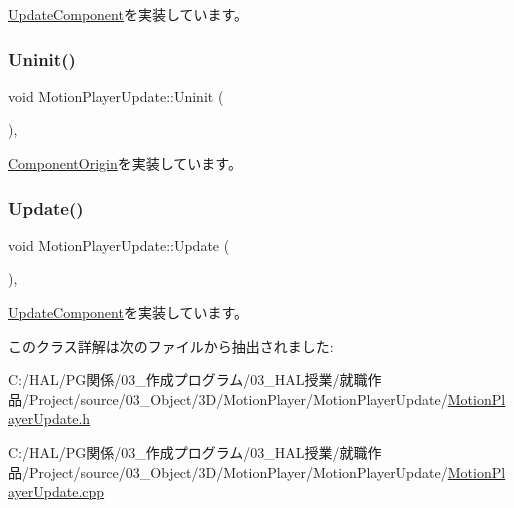 \mbox{\hyperlink{class_update_component_aecc61593be4d1feff2db4d9ff1f83f9f}{Update\+Component}}を実装しています。

\mbox{\label{class_motion_player_update_a2e896662b3f2bfbe468a6956f5d935bb}} 
\subsubsection{\texorpdfstring{Uninit()}{Uninit()}}
{\footnotesize\ttfamily void Motion\+Player\+Update\+::\+Uninit (\begin{DoxyParamCaption}{ }\end{DoxyParamCaption})\hspace{0.3cm}{\ttfamily [override]}, {\ttfamily [virtual]}}



\mbox{\hyperlink{class_component_origin_a9f89a93f9c1954bd53f9750e35e6089d}{Component\+Origin}}を実装しています。

\mbox{\label{class_motion_player_update_a006a6da88cbd4a87da598f806569533a}} 
\subsubsection{\texorpdfstring{Update()}{Update()}}
{\footnotesize\ttfamily void Motion\+Player\+Update\+::\+Update (\begin{DoxyParamCaption}{ }\end{DoxyParamCaption})\hspace{0.3cm}{\ttfamily [override]}, {\ttfamily [virtual]}}



\mbox{\hyperlink{class_update_component_ade313ad8bf19a81e7d098aa830d9f01b}{Update\+Component}}を実装しています。



このクラス詳解は次のファイルから抽出されました\+:\begin{DoxyCompactItemize}
\item 
C\+:/\+H\+A\+L/\+P\+G関係/03\+\_\+作成プログラム/03\+\_\+\+H\+A\+L授業/就職作品/\+Project/source/03\+\_\+\+Object/3\+D/\+Motion\+Player/\+Motion\+Player\+Update/\mbox{\hyperlink{_motion_player_update_8h}{Motion\+Player\+Update.\+h}}\item 
C\+:/\+H\+A\+L/\+P\+G関係/03\+\_\+作成プログラム/03\+\_\+\+H\+A\+L授業/就職作品/\+Project/source/03\+\_\+\+Object/3\+D/\+Motion\+Player/\+Motion\+Player\+Update/\mbox{\hyperlink{_motion_player_update_8cpp}{Motion\+Player\+Update.\+cpp}}\end{DoxyCompactItemize}
